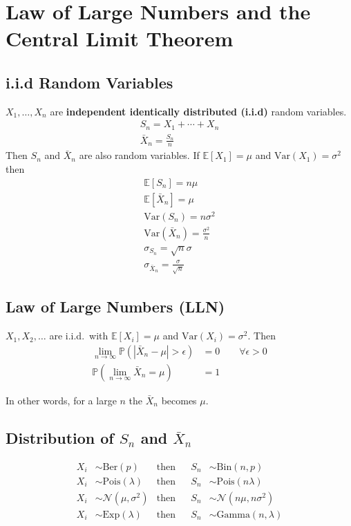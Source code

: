 \section{Law of Large Numbers and the Central Limit Theorem}

\subsection{i.i.d Random Variables}

$X_1, \ldots , X_n$ are \textbf{independent identically distributed (i.i.d)} random variables.
\begin{gather*}
    S_n = X_1 + \cdots + X_n \\
    \bar{X}_n = \frac{S_n}{n}
\end{gather*}
Then $S_n$ and $ \bar{X}_n$ are also random variables.
\newpar{}
If $\mathbb{E}[X_1]=\mu$ and $\mathrm{Var}(X_1)=\sigma^2$ then
\begin{gather*}
    \mathbb{E}[S_n]=n\mu \\
    \mathbb{E}[\bar{X}_n]=\mu \\
    \mathrm{Var}(S_n)=n\sigma^2 \\
    \mathrm{Var}(\bar{X}_n)=\frac{\sigma^2}{n} \\
    \sigma_{S_n}=\sqrt{n}\sigma \\
    \sigma_{\bar{X}_n}=\frac{\sigma}{\sqrt{n}}
\end{gather*}

\subsection{Law of Large Numbers (LLN)}
$X_1, X_2, \ldots$ are i.i.d.\ with $\mathbb{E}[X_i]=\mu$ and $\mathrm{Var}(X_i)=\sigma^2$. Then
\begin{align*}
    \lim_{n\to\infty}\mathbb{P}\left(\left|\bar{X}_n-\mu\right|>\epsilon\right) & =0 \qquad \forall \epsilon > 0 \\
    \mathbb{P}\left(\lim_{n\to\infty}\bar{X}_n=\mu\right)                       & =1
\end{align*}

In other words, for a large $n$ the $\bar{X}_n$ becomes $\mu$.

\subsection{Distribution of $S_n$ and $\bar{X}_n$}
\noindent\begin{align*}
    X_i & \sim \mathrm{Ber}(p)            & \text{then} &  & S_n & \sim \mathrm{Bin}(n,p)            \\
    X_i & \sim \mathrm{Pois}(\lambda)     & \text{then} &  & S_n & \sim \mathrm{Pois}(n\lambda)      \\
    X_i & \sim \mathcal{N}(\mu, \sigma^2) & \text{then} &  & S_n & \sim \mathcal{N}(n\mu, n\sigma^2) \\
    X_i & \sim \mathrm{Exp}(\lambda)      & \text{then} &  & S_n & \sim \mathrm{Gamma}(n, \lambda)
\end{align*}

